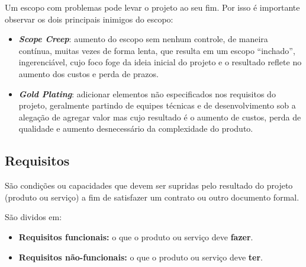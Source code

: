 Um escopo com problemas pode levar o projeto ao seu fim. Por isso é importante observar os dois principais inimigos do escopo:

\begin{itemize}

\item \textbf{\textit{Scope Creep}}: aumento do escopo sem nenhum controle, de maneira contínua, muitas vezes de forma lenta, que resulta em um escopo ``inchado'', ingerenciável, cujo foco foge da ideia inicial do projeto e o resultado reflete no aumento dos custos e perda de prazos.

\item \textbf{\textit{Gold Plating}}: adicionar elementos não especificados nos requisitos do projeto, geralmente partindo de equipes técnicas e de desenvolvimento sob a alegação de agregar valor mas cujo resultado é o aumento de custos, perda de qualidade e aumento desnecessário da complexidade do produto.

\end{itemize}

\subsection{Requisitos}

São condições ou capacidades que devem ser supridas pelo resultado do projeto (produto ou serviço) a fim de satisfazer um contrato ou outro documento formal.

São dividos em:

\begin{itemize}

\item \textbf{Requisitos funcionais:} o que o produto ou serviço deve \textbf{fazer}.

\item \textbf{Requisitos não-funcionais:} o que o produto ou serviço deve \textbf{ter}.

\end{itemize}